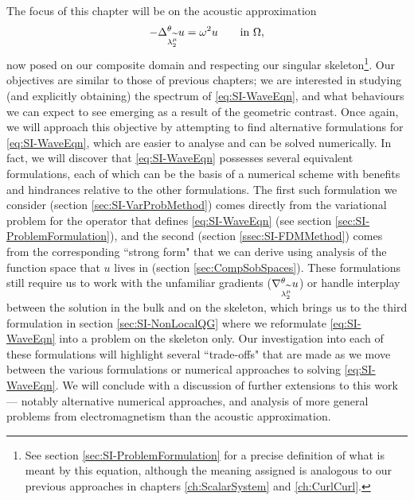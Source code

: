 The focus of this chapter will be on the acoustic approximation
\begin{align} \label{eq:SI-WaveEqn}
	-\Delta_{\lambda_2^{\widetilde{\mu}}}^\theta u = \omega^2 u \qquad\text{in } \Omega,
\end{align}
now posed on our composite domain and respecting our singular skeleton\footnote{See section \ref{sec:SI-ProblemFormulation} for a precise definition of what is meant by this equation, although the meaning assigned is analogous to our previous approaches in chapters \ref{ch:ScalarSystem} and \ref{ch:CurlCurl}.}.
Our objectives are similar to those of previous chapters; we are interested in studying (and explicitly obtaining) the spectrum of \eqref{eq:SI-WaveEqn}, and what behaviours we can expect to see emerging as a result of the geometric contrast.
Once again, we will approach this objective by attempting to find alternative formulations for \eqref{eq:SI-WaveEqn}, which are easier to analyse and can be solved numerically.
In fact, we will discover that \eqref{eq:SI-WaveEqn} possesses several equivalent formulations, each of which can be the basis of a numerical scheme with benefits and hindrances relative to the other formulations.
The first such formulation we consider (section \ref{sec:SI-VarProbMethod}) comes directly from the variational problem for the operator that defines \eqref{eq:SI-WaveEqn} (see section \ref{sec:SI-ProblemFormulation}), and the second (section \ref{ssec:SI-FDMMethod}) comes from the corresponding ``strong form" that we can derive using analysis of the function space that $u$ lives in (section \ref{sec:CompSobSpaces}).
These formulations still require us to work with the unfamiliar gradients ($\nabla^{\theta}_{\lambda_2^{\widetilde{\mu}}}u$) or handle interplay between the solution in the bulk and on the skeleton, which brings us to the third formulation in section \ref{sec:SI-NonLocalQG} where we reformulate \eqref{eq:SI-WaveEqn} into a problem on the skeleton only.
Our investigation into each of these formulations will highlight several ``trade-offs" that are made as we move between the various formulations or numerical approaches to solving \eqref{eq:SI-WaveEqn}.
We will conclude with a discussion of further extensions to this work --- notably alternative numerical approaches, and analysis of more general problems from electromagnetism than the acoustic approximation.

